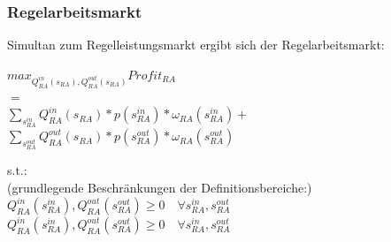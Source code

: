 \documentclass{article}
\begin{document}
\subsubsection{Regelarbeitsmarkt}
Simultan zum Regelleistungsmarkt ergibt sich der Regelarbeitsmarkt:
\begin{center}
	$max_{Q^{in}_{RA}(s_{RA}), Q^{out}_{RA}(s_{RA})} Profit_{RA}$\\ 
	$=$\\
	$\sum_{s^{in}_{RA}} Q^{in}_{RA}(s_{RA}) * p(s^{in}_{RA}) * \omega_{RA}(s^{in}_{RA}) +$\\
	$\sum_{s^{out}_{RA}} Q^{out}_{RA}(s_{RA}) * p(s^{out}_{RA}) * \omega_{RA}(s^{out}_{RA})$\\
\end{center}
s.t.:\\
	(grundlegende Beschränkungen der Definitionsbereiche:)\\
	$Q^{in}_{RA}(s^{in}_{RA}),Q^{out}_{RA}(s^{out}_{RA}) \geq 0 \quad\forall s^{in}_{RA},s^{out}_{RA} $\\
	$Q^{in}_{RA}(s^{in}_{RA}),Q^{out}_{RA}(s^{out}_{RA}) \geq 0\quad\forall  s^{in}_{RA},s^{out}_{RA} $\\
\end{document}
